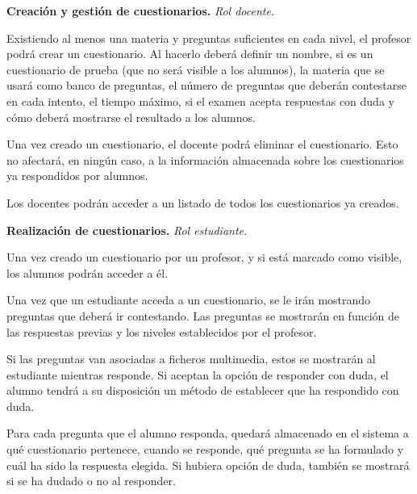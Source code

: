 \begin{rf0}
	\item \textbf{Creación y gestión de cuestionarios.} \textit{Rol docente.}
		\begin{rf0*}
			\item Existiendo al menos una materia y preguntas suficientes en cada nivel, el profesor podrá crear un cuestionario. Al hacerlo deberá definir un nombre, si es un cuestionario de prueba (que no será visible a los alumnos), la materia que se usará como banco de preguntas, el número de preguntas que deberán contestarse en cada intento, el tiempo máximo, si el examen acepta respuestas con duda y cómo deberá mostrarse el resultado a los alumnos.
			\item Una vez creado un cuestionario, el docente podrá eliminar el cuestionario. Esto no afectará, en ningún caso, a la información almacenada sobre los cuestionarios ya respondidos por alumnos.
			\item Los docentes podrán acceder a un listado de todos los cuestionarios ya creados.
		\end{rf0*}
		
	\item \textbf{Realización de cuestionarios.} \textit{Rol estudiante.}
		\begin{rf0*}
			\item Una vez creado un cuestionario por un profesor, y si está marcado como visible, los alumnos podrán acceder a él.
			\item Una vez que un estudiante acceda a un cuestionario, se le irán mostrando preguntas que deberá ir contestando. Las preguntas se mostrarán en función de las respuestas previas y los niveles establecidos por el profesor.
			\item Si las preguntas van asociadas a ficheros multimedia, estos se mostrarán al estudiante mientras responde. Si aceptan la opción de responder con duda, el alumno tendrá a su disposición un método de establecer que ha respondido con duda.
			\item Para cada pregunta que el alumno responda, quedará almacenado en el sistema a qué cuestionario pertenece, cuando se responde, qué pregunta se ha formulado y cuál ha sido la respuesta elegida. Si hubiera opción de duda, también se mostrará si se ha dudado o no al responder.
		\end{rf0*}
	

\end{rf0}
